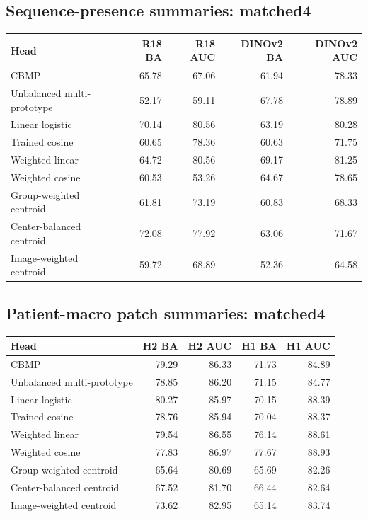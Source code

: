 \subsection*{Sequence-presence summaries: matched4}
\begingroup\small\setlength{\tabcolsep}{4pt}
\begin{longtable}{lrrrr}
\toprule
Head & R18 BA & R18 AUC & DINOv2 BA & DINOv2 AUC \\ \midrule
CBMP & 65.78 & 67.06 & 61.94 & 78.33 \\
Unbalanced multi-prototype & 52.17 & 59.11 & 67.78 & 78.89 \\
Linear logistic & 70.14 & 80.56 & 63.19 & 80.28 \\
Trained cosine & 60.65 & 78.36 & 60.63 & 71.75 \\
Weighted linear & 64.72 & 80.56 & 69.17 & 81.25 \\
Weighted cosine & 60.53 & 53.26 & 64.67 & 78.65 \\
Group-weighted centroid & 61.81 & 73.19 & 60.83 & 68.33 \\
Center-balanced centroid & 72.08 & 77.92 & 63.06 & 71.67 \\
Image-weighted centroid & 59.72 & 68.89 & 52.36 & 64.58 \\
\bottomrule\end{longtable}\endgroup

\subsection*{Patient-macro patch summaries: matched4}
\begingroup\small\setlength{\tabcolsep}{4pt}
\begin{longtable}{lrrrr}
\toprule
Head & H2 BA & H2 AUC & H1 BA & H1 AUC \\ \midrule
CBMP & 79.29 & 86.33 & 71.73 & 84.89 \\
Unbalanced multi-prototype & 78.85 & 86.20 & 71.15 & 84.77 \\
Linear logistic & 80.27 & 85.97 & 70.15 & 88.39 \\
Trained cosine & 78.76 & 85.94 & 70.04 & 88.37 \\
Weighted linear & 79.54 & 86.55 & 76.14 & 88.61 \\
Weighted cosine & 77.83 & 86.97 & 77.67 & 88.93 \\
Group-weighted centroid & 65.64 & 80.69 & 65.69 & 82.26 \\
Center-balanced centroid & 67.52 & 81.70 & 66.44 & 82.64 \\
Image-weighted centroid & 73.62 & 82.95 & 65.14 & 83.74 \\
\bottomrule\end{longtable}\endgroup
